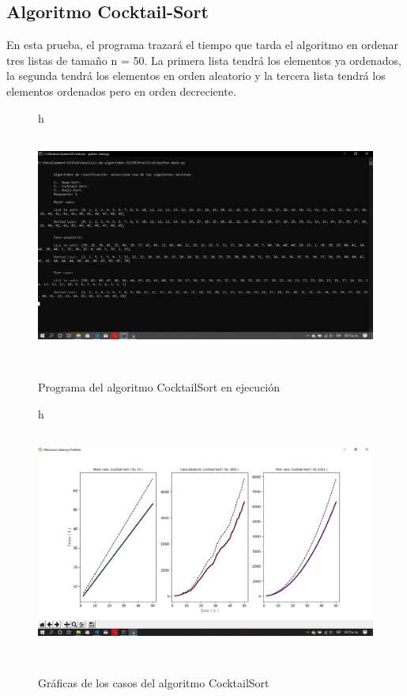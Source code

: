 \documentclass[12pt,twoside]{article}
\begin{document}
\subsection{Algoritmo Cocktail-Sort}
En esta prueba, el programa trazará el tiempo que tarda el algoritmo en ordenar tres listas de tamaño n = 50.
La primera lista tendrá los elementos ya ordenados, la segunda tendrá los elementos en orden aleatorio y la tercera lista tendr\'a los elementos ordenados pero en orden decreciente.
\begin{figure}{h}
    \centering
    \includegraphics[width=13cm, height=8cm]{CocktailConsole.png}
    \caption{Programa del algoritmo CocktailSort en ejecuci\'on}
    \label{fig:quick_program}
\end{figure}
\begin{figure}{h}
    \centering
    \includegraphics[width=13cm, height=8cm]{CocktailGraph.png}
    \caption{Gr\'aficas de los casos del algoritmo CocktailSort}
    \label{fig:quick_program}
\end{figure}
\end{document}
